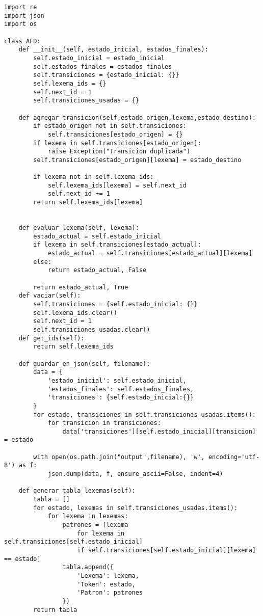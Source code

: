 \documentclass[12pt,a4paper]{scrartcl} %
\begin{document}
\begin{verbatim}
import re
import json
import os

class AFD:
    def __init__(self, estado_inicial, estados_finales):
        self.estado_inicial = estado_inicial
        self.estados_finales = estados_finales
        self.transiciones = {estado_inicial: {}}
        self.lexema_ids = {}
        self.next_id = 1
        self.transiciones_usadas = {}  
        
    def agregar_transicion(self,estado_origen,lexema,estado_destino):
        if estado_origen not in self.transiciones:
            self.transiciones[estado_origen] = {}
        if lexema in self.transiciones[estado_origen]:
            raise Exception("Transicion duplicada")
        self.transiciones[estado_origen][lexema] = estado_destino
        
        if lexema not in self.lexema_ids:
            self.lexema_ids[lexema] = self.next_id
            self.next_id += 1
        return self.lexema_ids[lexema]


    def evaluar_lexema(self, lexema):
        estado_actual = self.estado_inicial
        if lexema in self.transiciones[estado_actual]:
            estado_actual = self.transiciones[estado_actual][lexema]
        else:
            return estado_actual, False

        return estado_actual, True
    def vaciar(self):
        self.transiciones = {self.estado_inicial: {}}
        self.lexema_ids.clear()  
        self.next_id = 1
        self.transiciones_usadas.clear()    
    def get_ids(self):
        return self.lexema_ids

    def guardar_en_json(self, filename):
        data = {
            'estado_inicial': self.estado_inicial,
            'estados_finales': self.estados_finales,
            'transiciones': {self.estado_inicial:{}}
        }
        for estado, transiciones in self.transiciones_usadas.items():
            for transicion in transiciones:
                data['transiciones'][self.estado_inicial][transicion] = estado  
                                    
        with open(os.path.join("output",filename), 'w', encoding='utf-8') as f:
            json.dump(data, f, ensure_ascii=False, indent=4)
        
    def generar_tabla_lexemas(self):
        tabla = []
        for estado, lexemas in self.transiciones_usadas.items():
            for lexema in lexemas:
                patrones = [lexema 
                    for lexema in self.transiciones[self.estado_inicial] 
                    if self.transiciones[self.estado_inicial][lexema] == estado]
                tabla.append({
                    'Lexema': lexema,
                    'Token': estado,
                    'Patron': patrones
                })
        return tabla
\end{verbatim}
\end{document}
